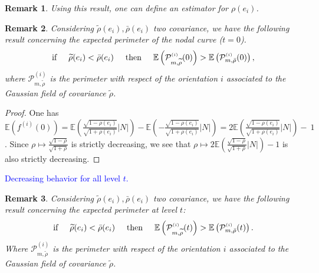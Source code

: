 \documentclass[12pt]{article}
\renewcommand{\tilde}{\widetilde}
\theoremstyle{Theorem}
\newtheorem{remark}{Remark}
\begin{document}
\begin{remark}
Using this result, one can define an estimator for $\rho(e_i)$. 
\end{remark}
\begin{remark}
\label{decreasingrho}
Considering $\tilde{\rho}(e_i), \bar{\rho}(e_i)$ two covariance, we  have the following result concerning the expected perimeter of the nodal curve ($t=0$).
\begin{equation*}
 \text{if} \hspace{0.5cm} \tilde{\rho}(e_i) < \bar{\rho}(e_i) \hspace{0.5cm} \text{then} \hspace{0.5cm}\mathbb{E}\left(\mathcal{P}^{\scriptscriptstyle (i)}_{m, \tilde{\rho}}(0)\right) > \mathbb{E}\left(\mathcal{P}^{\scriptscriptstyle (i)}_{m, \bar{\rho}}(0)\right),
\end{equation*}
where $\mathcal{P}^{\scriptscriptstyle (i)}_{m, \tilde{\rho}}$ is the perimeter with respect of the orientation $i$ associated to the Gaussian field of covariance $\tilde{\rho}$. 
\end{remark}
\begin{proof}
One has $\mathbb{E}\left(f^{(i)}(0)\right) = \mathbb{E}\left(\frac{\sqrt{1-\rho(e_i)}}{\sqrt{1+\rho(e_i)}}|N|\right) - \mathbb{E}\left(-\frac{\sqrt{1-\rho(e_i)}}{\sqrt{1+\rho(e_i)}}|N|\right) = 2\mathbb{E}\left(\frac{\sqrt{1-\rho(e_i)}}{\sqrt{1+\rho(e_i)}}|N|\right) -~1$. Since $\rho \mapsto \frac{\sqrt{1-\rho}}{\sqrt{1+\rho}}$ is strictly decreasing, we see that $\rho \mapsto 2\mathbb{E}\left(\frac{\sqrt{1-\rho}}{\sqrt{1+\rho}}|N|\right) - 1 $ is also strictly decreasing. 
\end{proof}
\textcolor{blue}{Decreasing behavior for all level $t$.}
\begin{remark}
Considering $\tilde{\rho}(e_i), \bar{\rho}(e_i)$ two covariance, we  have the following result concerning the expected perimeter at level $t$:
\begin{equation*}
 \text{if} \hspace{0.5cm} \tilde{\rho}(e_i) < \bar{\rho}(e_i) \hspace{0.5cm} \text{then} \hspace{0.5cm}\mathbb{E}\left(\mathcal{P}^{\scriptscriptstyle (i)}_{m, \tilde{\rho}}(t)\right) > \mathbb{E}\left(\mathcal{P}^{\scriptscriptstyle (i)}_{m, \bar{\rho}}(t)\right).
\end{equation*}
Where $\mathcal{P}^{\scriptscriptstyle (i)}_{m, \tilde{\rho}}$ is the perimeter with respect of the orientation $i$ associated to the Gaussian field of covariance $\tilde{\rho}$. 
\end{remark}
\end{document}
